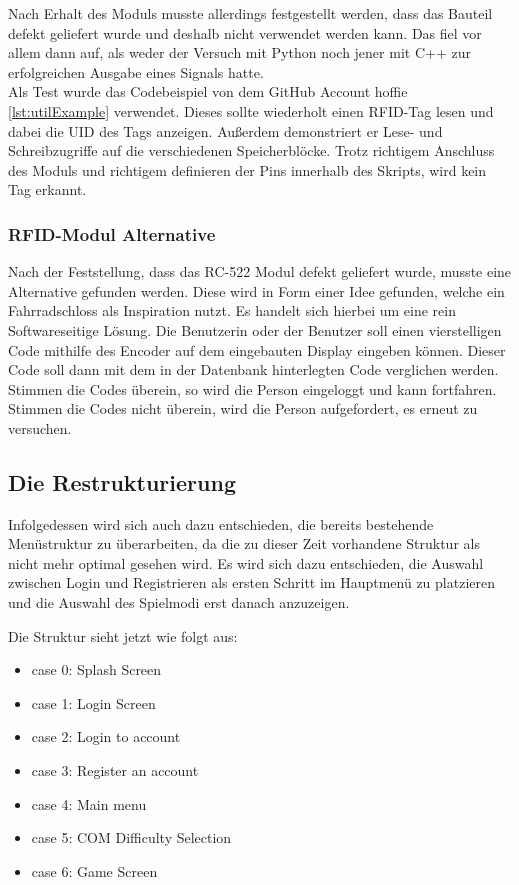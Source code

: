 Nach Erhalt des Moduls musste allerdings festgestellt werden, dass das Bauteil defekt geliefert wurde und deshalb nicht 
verwendet werden kann. Das fiel vor allem dann auf, als weder der Versuch mit Python noch jener mit C++ zur 
erfolgreichen Ausgabe eines Signals hatte.\\

Als Test wurde das Codebeispiel von dem GitHub Account hoffie \ref{lst:utilExample} verwendet. Dieses sollte wiederholt 
einen RFID-Tag lesen und dabei die UID des Tags anzeigen. Außerdem demonstriert er Lese- und Schreibzugriffe auf die 
verschiedenen Speicherblöcke. Trotz richtigem Anschluss des Moduls und richtigem definieren der Pins innerhalb des 
Skripts, wird kein Tag erkannt.


\subsubsection{RFID-Modul Alternative}
Nach der Feststellung, dass das RC-522 Modul defekt geliefert wurde, musste eine Alternative gefunden werden. Diese wird 
in Form einer Idee gefunden, welche ein Fahrradschloss als Inspiration nutzt. Es handelt sich hierbei um eine 
rein Softwareseitige Lösung. Die Benutzerin oder der Benutzer soll einen vierstelligen Code mithilfe des Encoder auf dem 
eingebauten Display eingeben können. Dieser Code soll dann mit dem in der Datenbank hinterlegten Code verglichen werden. 
Stimmen die Codes überein, so wird die Person eingeloggt und kann fortfahren. Stimmen die Codes nicht überein, wird die 
Person aufgefordert, es erneut zu versuchen.


\subsection{Die Restrukturierung}
Infolgedessen wird sich auch dazu entschieden, die bereits bestehende Menüstruktur zu überarbeiten, da die zu 
dieser Zeit vorhandene Struktur als nicht mehr optimal gesehen wird. Es wird sich dazu entschieden, die Auswahl 
zwischen \glqq Login\glqq{} und \glqq Registrieren\glqq{} als ersten Schritt im Hauptmenü zu platzieren und die Auswahl 
des Spielmodi erst danach anzuzeigen.

Die Struktur sieht jetzt wie folgt aus:
\begin{itemize}
	\item case 0: Splash Screen
	\item case 1: Login Screen
	\item case 2: Login to account
	\item case 3: Register an account
	\item case 4: Main menu
    \item case 5: COM Difficulty Selection
	\item case 6: Game Screen
\end{itemize}

